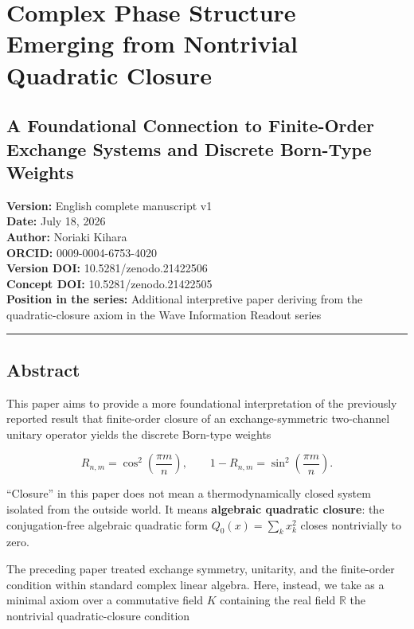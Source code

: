 \documentclass[
  a4paper,
  10pt]{article}
\author{}
\date{}
\begin{document}
\section{Complex Phase Structure Emerging from Nontrivial Quadratic
Closure}\label{complex-phase-structure-emerging-from-nontrivial-quadratic-closure}

\subsection{A Foundational Connection to Finite-Order Exchange Systems
and Discrete Born-Type
Weights}\label{a-foundational-connection-to-finite-order-exchange-systems-and-discrete-born-type-weights}

\textbf{Version:} English complete manuscript v1\\
\textbf{Date:} July 18, 2026\\
\textbf{Author:} Noriaki Kihara\\
\textbf{ORCID:} 0009-0004-6753-4020\\
\textbf{Version DOI:} 10.5281/zenodo.21422506\\
\textbf{Concept DOI:} 10.5281/zenodo.21422505\\
\textbf{Position in the series:} Additional interpretive paper deriving
from the quadratic-closure axiom in the Wave Information Readout series

\begin{center}\rule{0.5\linewidth}{0.5pt}\end{center}

\subsection{Abstract}\label{abstract}

This paper aims to provide a more foundational interpretation of the
previously reported result that finite-order closure of an
exchange-symmetric two-channel unitary operator yields the discrete
Born-type weights

\[
R_{n,m}=\cos^2\left(\frac{\pi m}{n}\right),
\qquad
1-R_{n,m}=\sin^2\left(\frac{\pi m}{n}\right).
\]

``Closure'' in this paper does not mean a thermodynamically closed
system isolated from the outside world. It means \textbf{algebraic
quadratic closure}: the conjugation-free algebraic quadratic form
\(Q_0(x)=\sum_kx_k^2\) closes nontrivially to zero.

The preceding paper treated exchange symmetry, unitarity, and the
finite-order condition within standard complex linear algebra. Here,
instead, we take as a minimal axiom over a commutative field \(K\)
containing the real field \(\mathbb R\) the nontrivial quadratic-closure
condition
\end{document}
